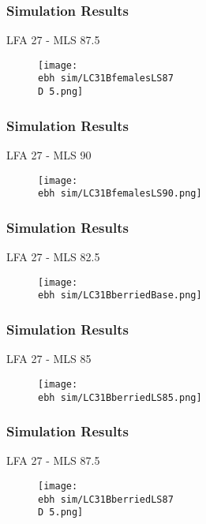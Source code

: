 \documentclass{beamer}
\newcommand{\ebh}{\string~/bio.data/bio.lobster/figures/LFA2733Framework2018/} %
\newcommand{\D}{.}
\begin{document}
\begin{frame}
\frametitle{Simulation Results}
LFA 27 - MLS 87.5
\begin{figure}
        \begin{center}
            \texttt{[image: \\ebh sim/LC31BfemalesLS87\\D 5.png]}
        \end{center}
    \end{figure}
\end{frame}


\begin{frame}
\frametitle{Simulation Results}
LFA 27 - MLS 90
\begin{figure}
        \begin{center}
            \texttt{[image: \\ebh sim/LC31BfemalesLS90.png]}
        \end{center}
    \end{figure}
\end{frame}




\begin{frame}
\frametitle{Simulation Results}
LFA 27 - MLS 82.5
\begin{figure}
        \begin{center}
            \texttt{[image: \\ebh sim/LC31BberriedBase.png]}
        \end{center}
    \end{figure}
\end{frame}



\begin{frame}
\frametitle{Simulation Results}
LFA 27 - MLS 85
\begin{figure}
        \begin{center}
            \texttt{[image: \\ebh sim/LC31BberriedLS85.png]}
        \end{center}
    \end{figure}
\end{frame}


\begin{frame}
\frametitle{Simulation Results}
LFA 27 - MLS 87.5
\begin{figure}
        \begin{center}
            \texttt{[image: \\ebh sim/LC31BberriedLS87\\D 5.png]}
        \end{center}
    \end{figure}
\end{frame}
\end{document}
